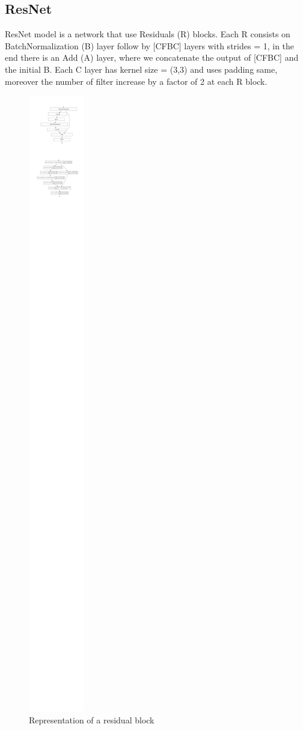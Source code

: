 \documentclass[10pt,twocolumn,letterpaper]{article}
\begin{document}
\subsection{ResNet}
\label{subsection:ResNet}
ResNet model is a network that use Residuals (R) blocks. Each R consists on BatchNormalization (B) layer follow by [CFBC] layers with strides = 1, in the end there is an Add (A) layer, where we concatenate the output of [CFBC] and the initial B. Each C layer has kernel size = (3,3) and uses padding same, moreover the number of filter increase by a factor of 2 at each R block.
\begin{figure}[H]
   \centering
   \includegraphics[width=0.6\linewidth]{./immagini/residual_block.pdf}
   \caption{Representation of a residual block}
\end{figure}
\end{document}
